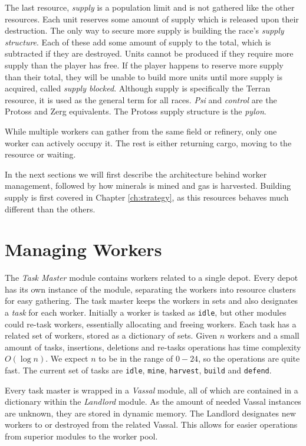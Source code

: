 The last resource, \emph{supply} is a population limit and is not gathered like the other resources. Each unit reserves some amount of supply which is released upon their destruction. The only way to secure more supply is building the race's \emph{supply structure}. Each of these add some amount of supply to the total, which is subtracted if they are destroyed. Units cannot be produced if they require more supply than the player has free. If the player happens to reserve more supply than their total, they will be unable to build more units until more supply is acquired, called \emph{supply blocked}. Although supply is specifically the Terran resource, it is used as the general term for all races. \emph{Psi} and \emph{control} are the Protoss and Zerg equivalents. The Protoss supply structure is the \emph{pylon}.

While multiple workers can gather from the same field or refinery, only one worker can actively occupy it. The rest is either returning cargo, moving to the resource or waiting.

In the next sections we will first describe the architecture behind worker management, followed by how minerals is mined and gas is harvested. Building supply is first covered in Chapter \ref{ch:strategy}, as this resources behaves much different than the others.

\section{Managing Workers}
\label{sec:manageWorkers}
The \emph{Task Master} module contains workers related to a single depot. Every depot has its own instance of the module, separating the workers into resource clusters for easy gathering. The task master keeps the workers in sets and also designates a \emph{task} for each worker. Initially a worker is tasked as \texttt{idle}, but other modules could re-task workers, essentially allocating and freeing workers. Each task has a related set of workers, stored as a dictionary of sets. Given $n$ workers and a small amount of tasks, insertions, deletions and re-tasks operations has time complexity $O(\log n)$. We expect $n$ to be in the range of $0-24$, so the operations are quite fast. The current set of tasks are \texttt{idle}, \texttt{mine}, \texttt{harvest}, \texttt{build} and \texttt{defend}.

Every task master is wrapped in a \emph{Vassal} module, all of which are contained in a dictionary within the \emph{Landlord} module. As the amount of needed Vassal instances are unknown, they are stored in dynamic memory. The Landlord designates new workers to or destroyed from the related Vassal. This allows for easier operations from superior modules to the worker pool.

